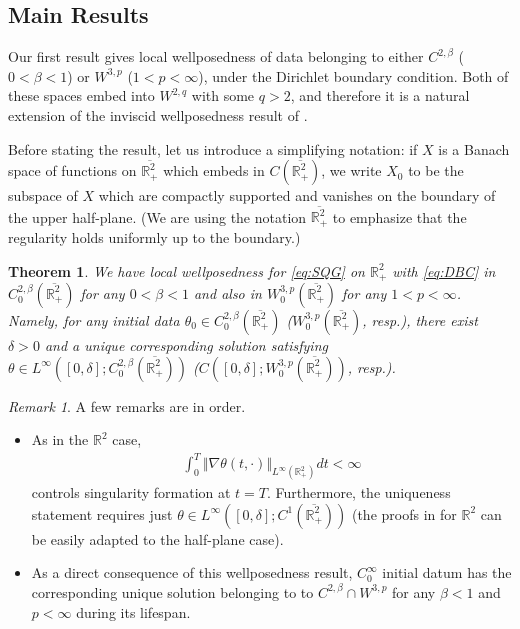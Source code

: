 \documentclass[10pt]{amsart}
\newtheorem{maintheorem}{Theorem}
\theoremstyle{definition}
\theoremstyle{remark}
\newtheorem{remark}[theorem]{Remark}
\numberwithin{equation}{section}
\newcommand{\nrm}[1]{\Vert#1\Vert}
\newcommand{\nb}{\nabla}
\newcommand{\0}{\emptyset}
\newcommand{\ohp}{\overline{\bbR^2_+}}
\newcommand{\bt}{\beta}
\newcommand{\dlt}{\delta}
\newcommand{\tht}{\theta}
\newcommand{\bbR}{\mathbb R}
\begin{document}
	
	\subsection{Main Results}\label{sec_results}
	
	Our first result gives local wellposedness of data belonging to either $C^{2,\bt}$ ($0<\bt<1$) or $W^{3,p}$ ($1<p<\infty$), under the Dirichlet boundary condition. Both of these spaces embed into $W^{2,q}$ with some $q>2$, and therefore it is a natural extension of the inviscid wellposedness result of \cite{CNgu}. 
	
	Before stating the result, let us introduce a simplifying notation: if $X$ is a Banach space of functions on $\ohp$ which embeds in $C(\ohp)$, we write $X_{0}$ to be the subspace of $X$ which are compactly supported and vanishes on the boundary of the upper half-plane. (We are using the notation $\ohp$ to emphasize that the regularity holds uniformly up to the boundary.)
	 
	\begin{maintheorem}\label{thm:loc} We have local wellposedness for \eqref{eq:SQG} on $\bbR^{2}_{+}$ with \eqref{eq:DBC} in $C^{2,\bt}_{0}(\ohp)$ for any $0<\bt<1$ and also in $W^{3,p}_{0}(\ohp)$ for any $1 < p < \infty$. Namely, for any initial data $\tht_{0} \in C^{2,\bt}_{0}(\ohp)$ ($W^{3,p}_{0}(\ohp)$, resp.), there exist $\dlt>0$ and a unique corresponding solution satisfying $\tht \in L^{\infty}([0,\dlt]; C^{2,\bt}_{0}(\ohp) )$ (${C}([0,\dlt]; W^{3,p}_{0}(\ohp) )$, resp.). 
	\end{maintheorem}
	 

\begin{remark}
	A few remarks are in order. \begin{itemize}
		\item As in the $\bbR^{2}$ case,   \begin{equation*}
			\begin{split}
				\int_0^T \nrm{\nb \tht(t,\cdot)}_{L^\infty(\bbR^2_+)} dt < \infty 
			\end{split}
		\end{equation*} controls singularity formation at $t=T$. Furthermore, the uniqueness statement requires just $\tht \in L^{\infty}([0,\dlt];C^{1}(\ohp))$ (the proofs in \cite{Bed,KJ-SQG} for $\bbR^2$ can be easily adapted to the half-plane case). 
		\item  As a direct consequence of this wellposedness result, $C^\infty_0$ initial datum has the corresponding unique solution belonging to to $C^{2,\bt} \cap W^{3,p}$ for any $\bt<1$ and $p<\infty$ during its lifespan.
	\end{itemize}
\end{remark} 
	
\end{document}

